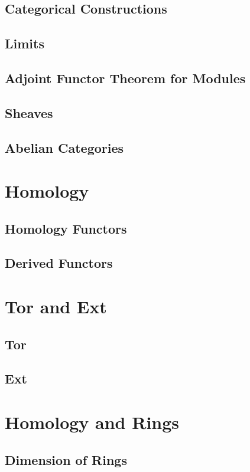 \documentclass[oneside]{amsbook}
\begin{document}
\section{Categorical Constructions}

\section{Limits}

\section{Adjoint Functor Theorem for Modules}

\section{Sheaves}

\section{Abelian Categories}


\chapter{Homology}
\section{Homology Functors}

\section{Derived Functors}


\chapter{Tor and Ext}
\section{Tor}

\section{Ext}


\chapter{Homology and Rings}
\section{Dimension of Rings}

\setcounter{section}{2}
\end{document}
